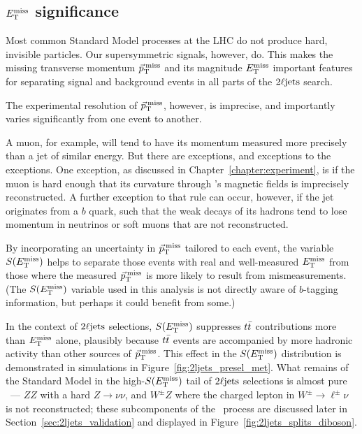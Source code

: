 \subsection{\texorpdfstring{$E_\mathrm{T}^\mathrm{miss}$}{ETmiss} significance}
\label{sec:2ljets_metsig}
Most common Standard Model processes at the LHC do not produce hard,
invisible particles.
Our supersymmetric signals, however, do.
This makes the missing transverse momentum $\vec p_\mathrm{T}^\mathrm{\:miss}$ and its magnitude $E_\mathrm{T}^\mathrm{miss}$
important features for separating signal and background events in all parts
of the $2\ell\mathrm{jets}$ search.

The experimental resolution of $\vec p_\mathrm{T}^\mathrm{\:miss}$, however, is imprecise, and
importantly varies significantly from one event to another.

A muon, for example, will tend to have its momentum measured more precisely
than a jet of similar energy.
But there are exceptions, and exceptions to the exceptions.
One exception, as discussed in Chapter~\ref{chapter:experiment}, is if the muon
is hard enough that its curvature through \atlas's magnetic fields is
imprecisely reconstructed.
A further exception to that rule can occur, however, if the jet originates from a
$b$ quark, such that the weak decays of its hadrons tend to lose momentum in
neutrinos or soft muons that are not reconstructed.

By incorporating an uncertainty in $\vec p_\mathrm{T}^\mathrm{\:miss}$ tailored to each event, the
variable $S(E_\mathrm{T}^\mathrm{miss})$ helps to separate those events with real and well-measured
$E_\mathrm{T}^\mathrm{miss}$ from those where the measured $\vec p_\mathrm{T}^\mathrm{\:miss}$ is more likely to result from
mismeasurements.
(The $S(E_\mathrm{T}^\mathrm{miss})$ variable used in this analysis is not directly
aware of $b$-tagging information, but perhaps it could benefit from some.)

In the context of $2\ell\mathrm{jets}$ selections, $S(E_\mathrm{T}^\mathrm{miss})$ suppresses $t\bar t$
contributions more than $E_\mathrm{T}^\mathrm{miss}$ alone, plausibly because $t\bar t$ events are
accompanied by more hadronic activity than other sources of $\vec p_\mathrm{T}^\mathrm{\:miss}$.
This effect in the $S(E_\mathrm{T}^\mathrm{miss})$ distribution is demonstrated in simulations in
Figure~\ref{fig:2ljets_presel_met}.
What remains of the Standard Model in the high-$S(E_\mathrm{T}^\mathrm{miss})$ tail of $2\ell\mathrm{jets}$
selections is almost pure \diboson\ --- $ZZ$ with a hard $Z\to \nu\nu$,
and $W^\pm Z$ where the charged lepton in $W^\pm\to\ell^\pm\nu$
is not reconstructed; these subcomponents of the \diboson\ process are discussed
later in Section~\ref{sec:2ljets_validation} and displayed in
Figure~\ref{fig:2ljets_splits_diboson}.

